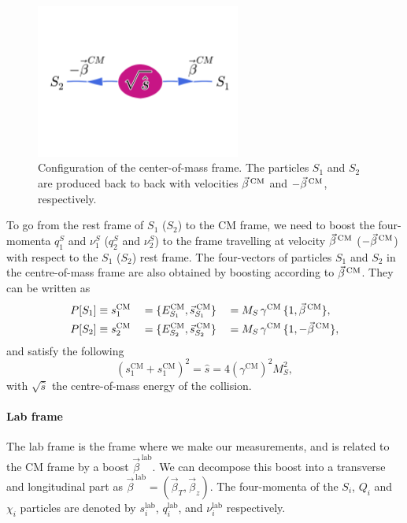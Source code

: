 \begin{figure}[htpb]
  \centering
  \includegraphics[width=0.6\textwidth,clip=true,trim=0 5.5cm 0
4.5cm]{figures/razor_variables/cm_frame} 
  \caption{Configuration of the center-of-mass frame. The particles $S_1$ and $S_2$ are
produced back to back with velocities $\vec{\beta}^{\,\textrm{CM}}$ and $-\vec{\beta}^{\,\textrm{CM}}$, respectively. 
\label{fig:razor_CM_frame}}
\end{figure}

To go from the rest frame of $S_1$ ($S_2$) to the CM frame, we need to boost the four-momenta
$q_1^S$ and $\nu_1^S$ ($q_2^S$ and $\nu_2^S$) to the frame travelling at velocity $\vec{\beta}^{\,\textrm{CM}}$
($-\vec{\beta}^{\,\textrm{CM}}$) with respect to the $S_1$ ($S_2$) rest frame. 
The four-vectors of particles $S_1$ and $S_2$ in the centre-of-mass frame are also obtained by
boosting according to $\vec{\beta}^{\,\textrm{CM}}$. They can be written as
\begin{alignat}{6}
  P[S_1] &\equiv s^{\textrm{CM}}_1  &&= \{ E^{\textrm{CM}}_{S_1} , \vec{s}^{\,\textrm{CM}}_{S_1}\} 
&&= M_S \, \gamma^{\textrm{CM}} \, \{ 1 , \vec{\beta}^{\,\textrm{CM}}\} , \\ 
  P[S_2] &\equiv s^{\textrm{CM}}_2 &&= \{ E^{\textrm{CM}}_{S_2} , \vec{s}^{\,\textrm{CM}}_{S_2}\}
&&= M_S \, \gamma^{\textrm{CM}} \, \{ 1 , -\vec{\beta}^{\,\textrm{CM}}\},  
\end{alignat}
and satisfy the following
\begin{equation}
  (s^{\textrm{CM}}_1 + s^{\textrm{CM}}_1)^2 = \hat{s} = 4 (\gamma^{\textrm{CM}})^2 M_S^2,
\end{equation}
with $\sqrt{\hat{s}}$ the centre-of-mass energy of the collision. 


\paragraph{Lab frame}
The lab frame is the frame where we make our measurements, and is related to the CM frame by a
boost $\vec{\beta}^{\,\textrm{lab}}$. We can decompose this boost into a transverse and longitudinal
part as $\vec{\beta}^{\,\textrm{lab}} = (\vec{\beta}_T,\vec{\beta}_z)$. 
The four-momenta of the $S_i$, $Q_i$ and $\chi_i$ particles are denoted by $s^{\textrm{lab}}_i$,
$q^{\textrm{lab}}_i$, and $\nu^{\textrm{lab}}_i$ respectively. 



